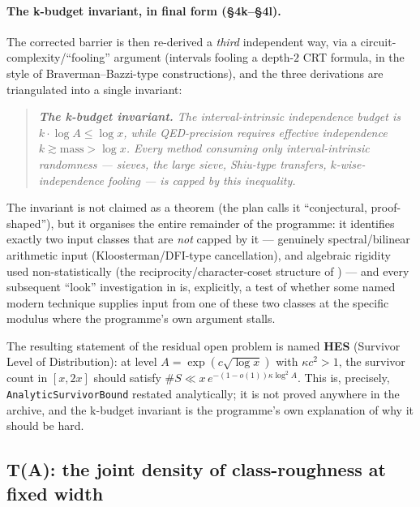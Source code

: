 \documentclass[11pt]{article}
\theoremstyle{plain}
\theoremstyle{definition}
\theoremstyle{remark}
\newcommand{\lean}[1]{\texttt{#1}}
\renewcommand{\_}{\textunderscore\allowbreak}
\begin{document}
\paragraph{The k-budget invariant, in final form (\S4k--\S4l).}
The corrected barrier is then re-derived a \emph{third} independent way, via a
circuit-complexity/``fooling'' argument (intervals fooling a depth-$2$ CRT formula, in the
style of Braverman--Bazzi-type constructions), and the three derivations are triangulated into
a single invariant:
\begin{quote}\itshape
\textbf{The k-budget invariant.} The interval-intrinsic independence budget is $k\cdot\log A\le
\log x$, while QED-precision requires effective independence $k\gtrsim\text{mass}>\log x$. Every
method consuming only interval-intrinsic randomness — sieves, the large sieve, Shiu-type
transfers, $k$-wise-independence fooling — is capped by this inequality.
\end{quote}
The invariant is not claimed as a theorem (the plan calls it ``conjectural, proof-shaped''), but
it organises the entire remainder of the programme: it identifies exactly two input classes that
are \emph{not} capped by it — genuinely spectral/bilinear arithmetic input (Kloosterman/DFI-type
cancellation), and algebraic rigidity used non-statistically (the reciprocity/character-coset
structure of ) — and every subsequent ``look'' investigation in
 is, explicitly, a test of whether some named modern technique
supplies input from one of these two classes at the specific modulus where the programme's own
argument stalls.

The resulting statement of the residual open problem is named \textbf{H\_ES} (Survivor Level of
Distribution): at level $A=\exp(c\sqrt{\log x})$ with $\kappa c^2>1$, the survivor count in
$[x,2x]$ should satisfy $\#S\ll x\,e^{-(1-o(1))\kappa\log^2A}$. This is, precisely,
\lean{AnalyticSurvivorBound} restated analytically; it is not proved anywhere in the archive,
and the k-budget invariant is the programme's own explanation of why it should be hard.

\subsection{T(A): the joint density of class-roughness at fixed width}
\label{subsec:t_a}
\end{document}
